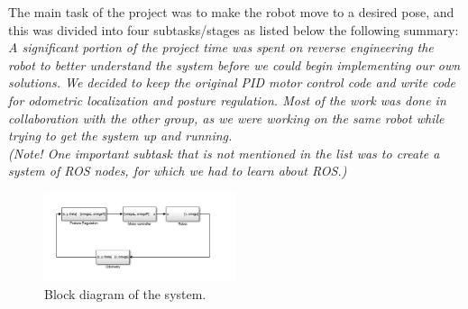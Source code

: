 \documentclass[a4paper,10pt]{article}
\begin{document}
The main task of the project was to make the robot move to a desired pose, and this was divided into four subtasks/stages as listed below the following summary:\\  
\textit{A significant portion of the project time was spent on reverse engineering the robot to better understand the system before we could begin implementing our own solutions.  
We decided to keep the original PID motor control code and write code for odometric localization and posture regulation. 
Most of the work was done in collaboration with the other group, 
as we were working on the same robot while trying to get the system up and running. \\
(Note! One important subtask that is not mentioned in the list was to create a system of ROS nodes, for which we had to learn about ROS.)}

\begin{figure}[H]
\centering
 \includegraphics[width=0.5\textwidth]{blokkskjema}
 \caption{Block diagram of the system.}
 \label{fig:2}
\end{figure}
\end{document}
